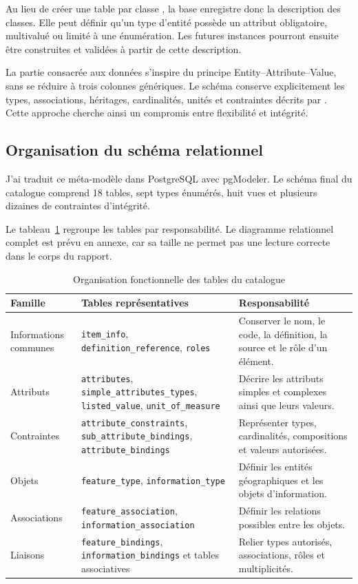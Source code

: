 Au lieu de créer une table par classe , la base enregistre donc la description des classes. Elle peut définir qu'un type d'entité possède un attribut obligatoire, multivalué ou limité à une énumération. Les futures instances pourront ensuite être construites et validées à partir de cette description.

La partie consacrée aux données s'inspire du principe Entity--Attribute--Value, sans se réduire à trois colonnes génériques. Le schéma conserve explicitement les types, associations, héritages, cardinalités, unités et contraintes décrits par . Cette approche cherche ainsi un compromis entre flexibilité et intégrité.

\subsection{Organisation du schéma relationnel}

J'ai traduit ce méta-modèle dans PostgreSQL avec pgModeler. Le schéma final du catalogue comprend 18 tables, sept types énumérés, huit vues et plusieurs dizaines de contraintes d'intégrité.

Le tableau~\ref{tab:familles-tables-s100} regroupe les tables par responsabilité. Le diagramme relationnel complet est prévu en annexe, car sa taille ne permet pas une lecture correcte dans le corps du rapport.

\begin{table}[H]
\centering
\begin{tabular}{p{3cm} p{5.1cm} p{5.9cm}}
\toprule
\textbf{Famille} & \textbf{Tables représentatives} & \textbf{Responsabilité} \\
\midrule
Informations communes & \texttt{item\_info}, \texttt{definition\_reference}, \texttt{roles} & Conserver le nom, le code, la définition, la source et le rôle d'un élément. \\
Attributs & \texttt{attributes}, \texttt{simple\_attributes\_types}, \texttt{listed\_value}, \texttt{unit\_of\_measure} & Décrire les attributs simples et complexes ainsi que leurs valeurs. \\
Contraintes & \texttt{attribute\_constraints}, \texttt{sub\_attribute\_bindings}, \texttt{attribute\_bindings} & Représenter types, cardinalités, compositions et valeurs autorisées. \\
Objets & \texttt{feature\_type}, \texttt{information\_type} & Définir les entités géographiques et les objets d'information. \\
Associations & \texttt{feature\_association}, \texttt{information\_association} & Définir les relations possibles entre les objets. \\
Liaisons & \texttt{feature\_bindings}, \texttt{information\_bindings} et tables associatives & Relier types autorisés, associations, rôles et multiplicités. \\
\bottomrule
\end{tabular}
\caption{Organisation fonctionnelle des tables du catalogue }
\label{tab:familles-tables-s100}
\end{table}

